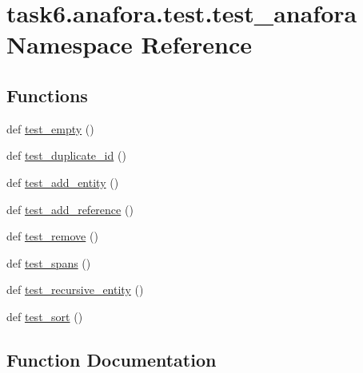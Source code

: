 \hypertarget{namespacetask6_1_1anafora_1_1test_1_1test__anafora}{}\section{task6.\+anafora.\+test.\+test\+\_\+anafora Namespace Reference}
\label{namespacetask6_1_1anafora_1_1test_1_1test__anafora}
\subsection*{Functions}
\begin{DoxyCompactItemize}
\item 
def \hyperlink{namespacetask6_1_1anafora_1_1test_1_1test__anafora_a939690d1f3661f9e960f557c48429062}{test\+\_\+empty} ()
\item 
def \hyperlink{namespacetask6_1_1anafora_1_1test_1_1test__anafora_a2c0584424f4606d2e0110d32fbd0b08f}{test\+\_\+duplicate\+\_\+id} ()
\item 
def \hyperlink{namespacetask6_1_1anafora_1_1test_1_1test__anafora_a489dc17df0c3931d918663fbdfd2f0be}{test\+\_\+add\+\_\+entity} ()
\item 
def \hyperlink{namespacetask6_1_1anafora_1_1test_1_1test__anafora_a59756891ffdf0334e4e38c653dd28a9e}{test\+\_\+add\+\_\+reference} ()
\item 
def \hyperlink{namespacetask6_1_1anafora_1_1test_1_1test__anafora_abf9db9b61c54c607bc3797b3f0c6a136}{test\+\_\+remove} ()
\item 
def \hyperlink{namespacetask6_1_1anafora_1_1test_1_1test__anafora_a15bca24eb5ca27d4bef75b936aa47076}{test\+\_\+spans} ()
\item 
def \hyperlink{namespacetask6_1_1anafora_1_1test_1_1test__anafora_ae7bb042a88f8ff398a4da908fc40d683}{test\+\_\+recursive\+\_\+entity} ()
\item 
def \hyperlink{namespacetask6_1_1anafora_1_1test_1_1test__anafora_a8b423a607cff537035219a540168ecee}{test\+\_\+sort} ()
\end{DoxyCompactItemize}


\subsection{Function Documentation}
\mbox{\label{namespacetask6_1_1anafora_1_1test_1_1test__anafora_a489dc17df0c3931d918663fbdfd2f0be}} 
